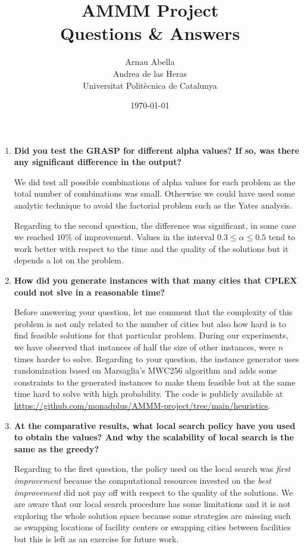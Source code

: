 \documentclass[12pt, a4paper]{article}
\title{%
  \vspace{-10ex}
  AMMM Project\\
  \large{Questions \& Answers}
}
\author{%
  Arnau Abella \\
  Andrea de las Heras \\
  \large{Universitat Polit\`ecnica de Catalunya}
}
\date{\today}
\begin{document}
\maketitle

\vspace{5ex}

\begin{enumerate}[label=\textbf{(\alph*)}]
  \item \textbf{Did you test the GRASP for different alpha values? If so, was there any significant difference in the output?}

  We did test all possible combinations of alpha values for each problem as the total number of combinations was small. Otherwise we could have used some analytic technique to avoid the factorial problem such as the Yates analysis.

  Regarding to the second question, the difference was significant, in some case we reached $10\%$ of improvement. Values in the interval $0.3 \leq \alpha \leq 0.5$ tend to work better with respect to the time and the quality of the solutions but it depends a lot on the problem.

\item \textbf{How did you generate instances with that many cities that CPLEX could not slve in a reasonable time?}

  Before answering your question, let me comment that the complexity of this problem is not only related to the number of cities but also how hard is to find feasible solutions for that particular problem. During our experiments, we have observed that instances of half the size of other instances, were $n$ times harder to solve. Regarding to your question, the instance generator uses randomization based on Marsaglia's MWC256 algorithm and adds some constraints to the generated instances to make them feasible but at the same time hard to solve with high probability. The code is publicly available at \url{https://github.com/monadplus/AMMM-project/tree/main/heuristics}.

\item \textbf{At the comparative results, what local search policy have you used to obtain the values? And why the scalability of local search is the same as the greedy?}

  Regarding to the first question, the policy used on the local search was \textit{first improvement} because the computational resources invested on the \textit{best improvement} did not pay off with respect to the quality of the solutions. We are aware that our local search procedure has some limitations and it is not exploring the whole solution space because some strategies are missing such as swapping locations of facility centers or swapping cities between facilities but this is left as an exercise for future work.


\end{enumerate}
\end{document}
